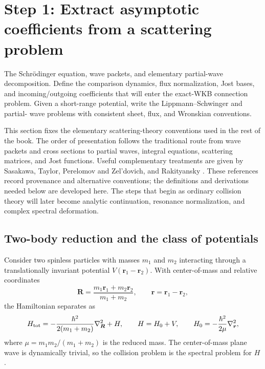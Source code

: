 \section{Step 1: Extract asymptotic coefficients from a scattering problem}
\label{sec:textbook-scattering}

\calculationroute
  {The Schr\"odinger equation, wave packets, and elementary partial-wave
  decomposition.}
  {Define the comparison dynamics, flux normalization, Jost bases, and
  incoming/outgoing coefficients that will enter the exact-WKB connection
  problem.}
  {Given a short-range potential, write the Lippmann--Schwinger and partial-
  wave problems with consistent sheet, flux, and Wronskian conventions.}

This section fixes the elementary scattering-theory conventions used in the
rest of the book.  The order of presentation follows the traditional route
from wave packets and cross sections to partial waves, integral equations,
scattering matrices, and Jost functions.  Useful complementary treatments are
given by Sasakawa, Taylor, Perelomov and Zel'dovich, and Rakityansky
\cite{Sasakawa:1991,Taylor:1972,PerelomovZeldovich:1998,
Rakityansky:2022Jost}.  These references record provenance and alternative
conventions; the definitions and derivations needed below are developed here.
The steps that begin as ordinary collision theory will later become analytic
continuation, resonance normalization, and complex spectral deformation.

\subsection{Two-body reduction and the class of potentials}
\label{subsec:two-body-reduction}

Consider two spinless particles with masses $m_1$ and $m_2$ interacting
through a translationally invariant potential $V(\bm r_1-\bm r_2)$.  With
center-of-mass and relative coordinates
\begin{equation}
  \bm R=\frac{m_1\bm r_1+m_2\bm r_2}{m_1+m_2},
  \qquad
  \bm r=\bm r_1-\bm r_2,
  \label{eq:cm-relative-coordinates}
\end{equation}
the Hamiltonian separates as
\begin{equation}
  H_{\mathrm{tot}}
  =-\frac{\hbar^2}{2(m_1+m_2)}\nabla_{\bm R}^2+H,
  \qquad
  H=H_0+V,
  \qquad
  H_0=-\frac{\hbar^2}{2\mu}\nabla_{\bm r}^2,
  \label{eq:two-body-relative-H}
\end{equation}
where $\mu=m_1m_2/(m_1+m_2)$ is the reduced mass.  The center-of-mass
plane wave is dynamically trivial, so the collision problem is the spectral
problem for $H$.


